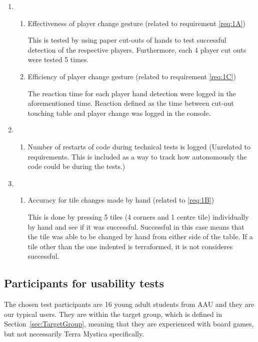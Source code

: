 \begin{enumerate}
	
\item \begin{enumerate}
\item Effectiveness of player change gesture (related to requirement \ref{req:1A})

This is tested by using paper cut-outs of hands to test successful detection of the respective players. Furthermore, each 4 player cut outs were tested 5 times.

\item Efficiency of player change gesture (related to requirement \ref{req:1C})

The reaction time for each player hand detection were logged in the aforementioned time. Reaction defined as the time between cut-out touching table and player change was logged in the console.
\end{enumerate}
	\item \begin{enumerate}
		\item Number of restarts of code during technical tests is logged (Unrelated to requirements. This is included as a way to track how autonomously the code could be during the tests.)
	\end{enumerate}
	\item \begin{enumerate}
		\item Accuracy for tile changes made by hand (related to \ref{req:1B})
		
		This is done by pressing 5 tiles (4 corners and 1 centre tile) individually by hand and see if it was successful. Successful in this case means that the tile was able to be changed by hand from either side of the table. If a tile other than the one indented is terraformed, it is not consideres successful.
	\end{enumerate}
\end{enumerate}

\subsection{Participants for usability tests}
The chosen test participants are 16 young adult students from AAU and they are our typical users. They are within the target group, which is defined in Section~\ref{sec:TargetGroup}, meaning that they are experienced with board games, but not necessarily Terra Mystica specifically. 

